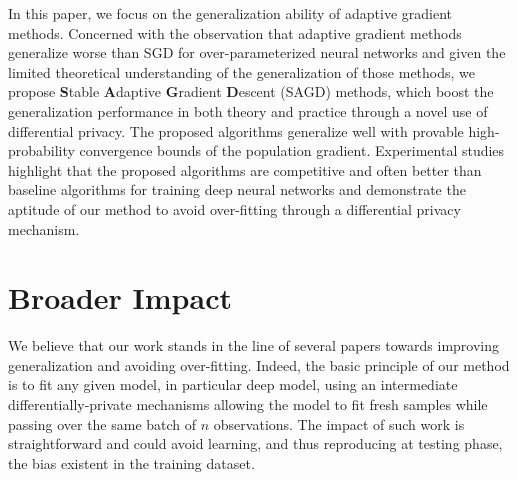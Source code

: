 \documentclass[11pt]{article}
\begin{document}
In this paper, we focus on the generalization ability of adaptive gradient methods. 
Concerned with the observation that adaptive gradient methods generalize worse than SGD for over-parameterized neural networks and given the limited theoretical understanding of the generalization of those methods,
we propose \textbf{S}table \textbf{A}daptive \textbf{G}radient \textbf{D}escent (\textsc{SAGD}) methods, which boost the generalization performance in both theory and practice through a novel use of differential privacy. 
The proposed algorithms generalize well with provable high-probability convergence bounds of the population gradient. 
Experimental studies highlight that the proposed algorithms are competitive and often better than baseline algorithms for training deep neural networks and demonstrate the aptitude of our method to avoid over-fitting through a differential privacy mechanism.


\clearpage
\section{Broader Impact}
We believe that our work stands in the line of several papers towards improving generalization and avoiding over-fitting.
Indeed, the basic principle of our method is to fit any given model, in particular deep model, using an intermediate differentially-private mechanisms allowing the model to fit fresh samples while passing over the same batch of $n$ observations.
The impact of such work is straightforward and could avoid learning, and thus reproducing at testing phase, the bias existent in the training dataset.






\clearpage


\appendix


\end{document}
